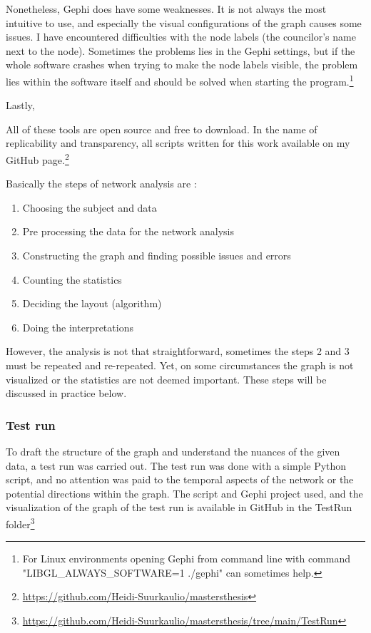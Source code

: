 Nonetheless, Gephi does have some weaknesses. It is not always the most intuitive to use, and especially the visual configurations of the graph causes some issues. I have encountered difficulties with the node labels (the councilor's name next to the node). Sometimes the problems lies in the Gephi settings, but if the whole software crashes when trying to make the node labels visible, the problem lies within the software itself and should be solved when starting the program.\footnote{For Linux environments opening Gephi from command line with command "LIBGL\_ALWAYS\_SOFTWARE=1 ./gephi" can sometimes help.} 

Lastly, 

All of these tools are open source and free to download. In the name of replicability and transparency, all scripts written for this work available on my GitHub page.\footnote{\url{https://github.com/Heidi-Suurkaulio/mastersthesis}}

Basically the steps of network analysis are : \begin{enumerate}
	\item Choosing the subject and data
	\item Pre processing the data for the network analysis
	\item Constructing the graph and finding possible issues and errors 
	\item Counting the statistics
	\item Deciding the layout (algorithm)
	\item Doing the interpretations
\end{enumerate}
However, the analysis is not that straightforward, sometimes the steps 2 and 3 must be repeated and re-repeated. Yet, on some circumstances the graph is not visualized or the statistics are not deemed important. These steps will be discussed in practice below.

\subsubsection{Test run}

To draft the structure of the graph and understand the nuances of the given data, a test run was carried out. The test run was done with a simple Python script, and no attention was paid to the temporal aspects of the network or the potential directions within the graph. The script and Gephi project used, and the visualization of the graph of the test run is available in GitHub in the TestRun folder\footnote{\url{https://github.com/Heidi-Suurkaulio/mastersthesis/tree/main/TestRun}}

